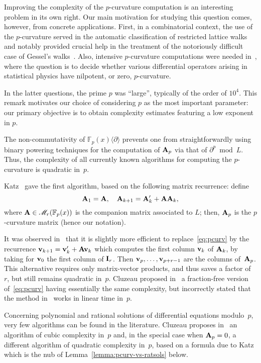 \documentclass{sig-alternate}
\def\F {\mathbb{F}}
\def\mA {\ensuremath{{\bf A}}}
\def\mv {\ensuremath{{\bf v}}}
\def\mI {\ensuremath{{\bf I}}}
\begin{document}
Improving the complexity of the $p$-curvature computation is an
interesting problem in its own right. Our main motivation for studying
this question comes, however, from concrete applications. First, in a
combinatorial context, the use of the $p$-curvature served in the
automatic classification of restricted lattice walks~\cite{BoKa08b}
and notably provided crucial help in the treatment of the notoriously
difficult case of Gessel's walks~\cite{BoKa08a}.  Also, intensive
$p$-curvature computations were needed in~\cite{BBHMWZ08}, where the
question is to decide whether various differential operators arising
in statistical physics have nilpotent, or zero, $p$-curvature. 

In the latter questions, the prime $p$ was ``large'', typically of the
order of $10^4$. This remark motivates our choice of considering $p$
as the most important parameter: our primary objective is to obtain
complexity estimates featuring a low exponent in $p$.

\smallskip{}  The non-commutativity of
$\F_p(x)\langle \partial \rangle$ prevents one from straightforwardly
using binary powering techniques for the computation of $\mA_p$ via
that of $\partial^p \bmod L$. Thus, the complexity of all currently
known algorithms for computing the $p$-curvature is quadratic in~$p$.

Katz~\cite{Katz82} gave the first algorithm, based on the following
matrix recurrence: define
\begin{equation}
  \label{eq:pcurv}
\mA_1 = \mA,\quad \mA_{k+1} = \mA_k' + \mA \mA_k,
\end{equation}
where $\mA \in \mathscr{M}_r(\F_p(x))$ is the companion matrix
associated to $L$; then, $\mA_p$ is the $p$-curvature matrix (hence
our notation). 

It was observed in~\cite[\S13.2.2]{PuSi03} that it is slightly more
efficient to replace~\eqref{eq:pcurv} by the recurrence $\mv_{k+1} =
\mv_k' + \mA \mv_k$ which computes the first column $\mv_k$ of
$\mA_k$, by taking for $\mv_0$ the first column of $\mI_r$. Then
$\mv_p,\ldots,\mv_{p+r-1}$ are the columns of~$\mA_p$. This
alternative requires only matrix-vector products, and thus saves a
factor of~$r$, but still remains quadratic in~$p$.  Cluzeau proposed
in~\cite[Prop.~3.2]{Cluzeau03} a fraction-free version
of~\eqref{eq:pcurv} having essentially the same complexity, but
incorrectly stated that the method in~\cite{PuSi03} works in linear
time in~$p$.

Concerning polynomial and rational solutions of differential equations
modulo~$p$, very few algorithms can be found in the literature. Cluzeau
proposes in~\cite[\S2]{Cluzeau03} an algorithm of cubic complexity
in~$p$ and, in the special case when $\mA_p=0$, a different algorithm
of quadratic complexity in~$p$, based on a formula due to Katz which is
the nub of Lemma~\ref{lemma:pcurv-vs-ratsols} below.
\end{document}
